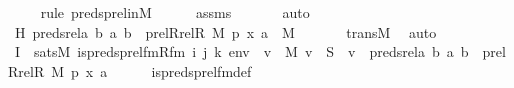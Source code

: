 \begin{isabellebody}
\ \ \ \ \isamarkupfalse%
{\isacharparenleft}{\kern0pt}rule\ preds{\isacharunderscore}{\kern0pt}prel{\isacharunderscore}{\kern0pt}in{\isacharunderscore}{\kern0pt}M{\isacharparenright}{\kern0pt}\isanewline
\ \ \ \ \isamarkupfalse%
\ assms\ \isanewline
\ \ \ \ \isamarkupfalse%
\ auto\isanewline
\ \ \isamarkupfalse%
\ \isamarkupfalse%
\ H{\isacharcolon}{\kern0pt}\ {\isachardoublequoteopen}preds{\isacharunderscore}{\kern0pt}rel{\isacharparenleft}{\kern0pt}{\isasymlambda}a\ b{\isachardot}{\kern0pt}\ {\isasymlangle}a{\isacharcomma}{\kern0pt}\ b{\isasymrangle}\ {\isasymin}\ prel{\isacharparenleft}{\kern0pt}Rrel{\isacharparenleft}{\kern0pt}R{\isacharcomma}{\kern0pt}\ M{\isacharparenright}{\kern0pt}{\isacharcomma}{\kern0pt}\ p{\isacharparenright}{\kern0pt}{\isacharcomma}{\kern0pt}\ {\isasymlangle}x{\isacharcomma}{\kern0pt}\ a{\isasymrangle}{\isacharparenright}{\kern0pt}\ {\isasymsubseteq}\ M{\isachardoublequoteclose}\ \isanewline
\ \ \ \ \isamarkupfalse%
\ transM\ \isamarkupfalse%
\ auto\isanewline
\ \isanewline
\ \ \isamarkupfalse%
\ I{}\ {\isacharcolon}{\kern0pt}\ {\isachardoublequoteopen}sats{\isacharparenleft}{\kern0pt}M{\isacharcomma}{\kern0pt}\ is{\isacharunderscore}{\kern0pt}preds{\isacharunderscore}{\kern0pt}prel{\isacharunderscore}{\kern0pt}fm{\isacharparenleft}{\kern0pt}Rfm{\isacharcomma}{\kern0pt}\ i{\isacharcomma}{\kern0pt}\ j{\isacharcomma}{\kern0pt}\ k{\isacharparenright}{\kern0pt}{\isacharcomma}{\kern0pt}\ env{\isacharparenright}{\kern0pt}\ {\isasymlongleftrightarrow}\ {\isacharparenleft}{\kern0pt}{\isasymforall}v\ {\isasymin}\ M{\isachardot}{\kern0pt}\ v\ {\isasymin}\ S\ {\isasymlongleftrightarrow}\ v\ {\isasymin}\ preds{\isacharunderscore}{\kern0pt}rel{\isacharparenleft}{\kern0pt}{\isasymlambda}a\ b{\isachardot}{\kern0pt}\ {\isacharless}{\kern0pt}a{\isacharcomma}{\kern0pt}\ b{\isachargreater}{\kern0pt}\ {\isasymin}\ prel{\isacharparenleft}{\kern0pt}Rrel{\isacharparenleft}{\kern0pt}R{\isacharcomma}{\kern0pt}\ M{\isacharparenright}{\kern0pt}{\isacharcomma}{\kern0pt}\ p{\isacharparenright}{\kern0pt}{\isacharcomma}{\kern0pt}\ {\isacharless}{\kern0pt}x{\isacharcomma}{\kern0pt}\ a{\isachargreater}{\kern0pt}{\isacharparenright}{\kern0pt}{\isacharparenright}{\kern0pt}{\isachardoublequoteclose}\isanewline
\ \ \ \ \isamarkupfalse%
\ is{\isacharunderscore}{\kern0pt}preds{\isacharunderscore}{\kern0pt}prel{\isacharunderscore}{\kern0pt}fm{\isacharunderscore}{\kern0pt}def\ \isanewline
\ \ \ \ \isamarkupfalse%

\end{isabellebody}
